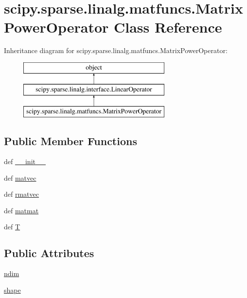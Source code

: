 \hypertarget{classscipy_1_1sparse_1_1linalg_1_1matfuncs_1_1MatrixPowerOperator}{}\section{scipy.\+sparse.\+linalg.\+matfuncs.\+Matrix\+Power\+Operator Class Reference}
\label{classscipy_1_1sparse_1_1linalg_1_1matfuncs_1_1MatrixPowerOperator}
Inheritance diagram for scipy.\+sparse.\+linalg.\+matfuncs.\+Matrix\+Power\+Operator\+:\begin{figure}[H]
\begin{center}
\leavevmode
\includegraphics[height=3.000000cm]{classscipy_1_1sparse_1_1linalg_1_1matfuncs_1_1MatrixPowerOperator}
\end{center}
\end{figure}
\subsection*{Public Member Functions}
\begin{DoxyCompactItemize}
\item 
def \hyperlink{classscipy_1_1sparse_1_1linalg_1_1matfuncs_1_1MatrixPowerOperator_a63dc558b6c07b8e9de61f8bf897582ec}{\+\_\+\+\_\+init\+\_\+\+\_\+}
\item 
def \hyperlink{classscipy_1_1sparse_1_1linalg_1_1matfuncs_1_1MatrixPowerOperator_a13ddd92d334340304748dc6fbb2af3a0}{matvec}
\item 
def \hyperlink{classscipy_1_1sparse_1_1linalg_1_1matfuncs_1_1MatrixPowerOperator_a96f015c11deee20a91abd723fe94be4d}{rmatvec}
\item 
def \hyperlink{classscipy_1_1sparse_1_1linalg_1_1matfuncs_1_1MatrixPowerOperator_a06da8f2caee95da55310ce75ee3670b1}{matmat}
\item 
def \hyperlink{classscipy_1_1sparse_1_1linalg_1_1matfuncs_1_1MatrixPowerOperator_a515c48fba0ca51217aa55af4518842c9}{T}
\end{DoxyCompactItemize}
\subsection*{Public Attributes}
\begin{DoxyCompactItemize}
\item 
\hyperlink{classscipy_1_1sparse_1_1linalg_1_1matfuncs_1_1MatrixPowerOperator_aed218003c5a29ebf80da236db4622c88}{ndim}
\item 
\hyperlink{classscipy_1_1sparse_1_1linalg_1_1matfuncs_1_1MatrixPowerOperator_ac2db298db480c5751ba59d99c232beeb}{shape}
\end{DoxyCompactItemize}


